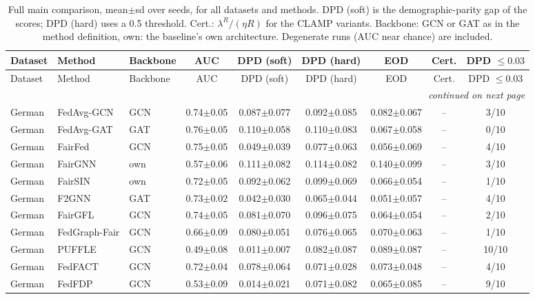 \scriptsize
\setlength{\tabcolsep}{1pt}
\begin{longtable}{lp{2.2cm}lcccccc}
\caption{Full main comparison, mean$\pm$sd over seeds, for all datasets and methods. DPD (soft) is the demographic-parity gap of the scores; DPD (hard) uses a 0.5 threshold. Cert.: $\lambda^{R}/(\eta R)$ for the CLAMP variants. Backbone: GCN or GAT as in the method definition, own: the baseline's own architecture. Degenerate runs (AUC near chance) are included.}\label{tab:e1_full}\\
\toprule
Dataset & Method & Backbone & AUC & DPD (soft) & DPD (hard) & EOD & Cert. & DPD $\le 0.03$ \\
\midrule
\endfirsthead
\toprule
Dataset & Method & Backbone & AUC & DPD (soft) & DPD (hard) & EOD & Cert. & DPD $\le 0.03$ \\
\midrule
\endhead
\midrule
\multicolumn{9}{r}{\textit{continued on next page}} \\
\endfoot
\bottomrule
\endlastfoot
German & FedAvg-GCN & GCN & 0.74$\pm$0.05 & 0.087$\pm$0.077 & 0.092$\pm$0.085 & 0.082$\pm$0.067 & -- & 3/10 \\
German & FedAvg-GAT & GAT & 0.76$\pm$0.05 & 0.110$\pm$0.058 & 0.110$\pm$0.083 & 0.067$\pm$0.058 & -- & 0/10 \\
German & FairFed & GCN & 0.75$\pm$0.05 & 0.049$\pm$0.039 & 0.077$\pm$0.063 & 0.056$\pm$0.069 & -- & 4/10 \\
German & FairGNN & own & 0.57$\pm$0.06 & 0.111$\pm$0.082 & 0.114$\pm$0.082 & 0.140$\pm$0.099 & -- & 3/10 \\
German & FairSIN & own & 0.72$\pm$0.05 & 0.092$\pm$0.062 & 0.099$\pm$0.069 & 0.066$\pm$0.054 & -- & 1/10 \\
German & F2GNN & GAT & 0.73$\pm$0.02 & 0.042$\pm$0.030 & 0.065$\pm$0.044 & 0.051$\pm$0.057 & -- & 4/10 \\
German & FairGFL & GCN & 0.74$\pm$0.05 & 0.081$\pm$0.070 & 0.096$\pm$0.075 & 0.064$\pm$0.054 & -- & 2/10 \\
German & FedGraph-Fair & GCN & 0.66$\pm$0.09 & 0.080$\pm$0.051 & 0.076$\pm$0.065 & 0.070$\pm$0.063 & -- & 1/10 \\
German & PUFFLE & GCN & 0.49$\pm$0.08 & 0.011$\pm$0.007 & 0.082$\pm$0.087 & 0.089$\pm$0.087 & -- & 10/10 \\
German & FedFACT & GCN & 0.72$\pm$0.04 & 0.078$\pm$0.064 & 0.071$\pm$0.028 & 0.073$\pm$0.048 & -- & 4/10 \\
German & FedFDP & GCN & 0.53$\pm$0.09 & 0.014$\pm$0.021 & 0.071$\pm$0.082 & 0.065$\pm$0.085 & -- & 9/10 \\

\end{longtable}
